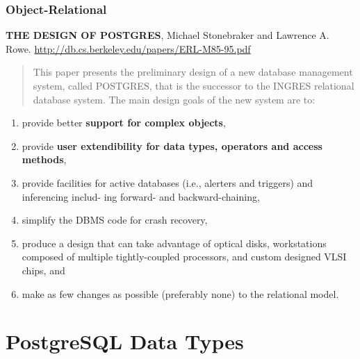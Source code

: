 \documentclass[xcolor=dvipsnames]{beamer}
\begin{document}
{
 
  \begin{frame}
    \frametitle{Object-Relational}

    \textbf{THE DESIGN OF POSTGRES}, Michael Stonebraker and Lawrence A.
    Rowe. \url{http://db.cs.berkeley.edu/papers/ERL-M85-95.pdf}

    \begin{quote}
    {\scriptsize This paper presents the preliminary design of a new database
      management system, called POSTGRES, that is the successor to the
      INGRES relational database system. The main design goals of the new
      system are to:}
    \end{quote}

    \begin{enumerate}
    \item provide better \textbf{support for complex objects},
    \item provide \textbf{user extendibility for data types, operators and
      access methods},
    \item {\tiny provide facilities for active databases (i.e., alerters and
      triggers) and inferencing includ- ing forward- and backward-chaining,}
    \item {\tiny simplify the DBMS code for crash recovery,}
    \item {\tiny produce a design that can take advantage of optical disks,
      workstations composed of multiple tightly-coupled processors, and
      custom designed VLSI chips, and}
    \item make as few changes as possible (preferably none) to the
      relational model.
    \end{enumerate}

  \end{frame}
}


\section{PostgreSQL Data Types}
\end{document}
